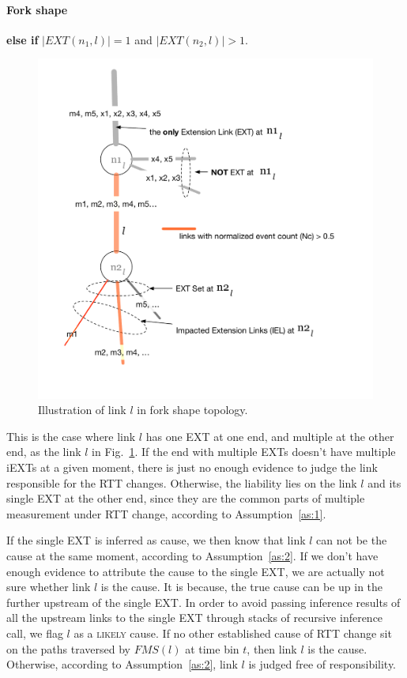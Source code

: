 \paragraph{Fork shape} \textbf{else if} $|EXT(n_1, l)| = 1$ and  $|EXT(n_2, l)| > 1$.

\begin{figure}[!htb]
\centering
\includegraphics[width=.9\textwidth]{gfx/chap5/fork_shape.pdf}
\caption{Illustration of link $l$ in fork shape topology.}
\label{fig:chap5_fork_shape}
\end{figure}

This is the case where link $l$ has one \ac{EXT} at one end, and multiple at the other end, as the link $l$ in Fig.~\ref{fig:chap5_fork_shape}. If the end with multiple \acp{EXT} doesn't have multiple \acp{iEXT} at a given moment, there is just no enough evidence to judge the link responsible for the RTT changes. Otherwise, the liability lies on the link $l$ and its single \ac{EXT} at the other end, since they are the common parts of multiple measurement under RTT change, according to Assumption~\ref{as:1}.

If the single \ac{EXT} is inferred as cause, we then know that link $l$ can not be the cause at the same moment, according to Assumption~\ref{as:2}. If we don't have enough evidence to attribute the cause to the single \ac{EXT}, we are actually not sure whether link $l$ is the cause. It is because, the true cause can be up in the further upstream of the single \ac{EXT}. In order to avoid passing inference results of all the upstream links to the single \ac{EXT} through stacks of recursive inference call, we flag $l$ as a \textsc{likely} cause.
If no other established cause of RTT change sit on the paths traversed by $FMS(l)$ at time bin $t$, then link $l$ is the cause. Otherwise, according to Assumption~\ref{as:2}, link $l$ is judged free of responsibility.

